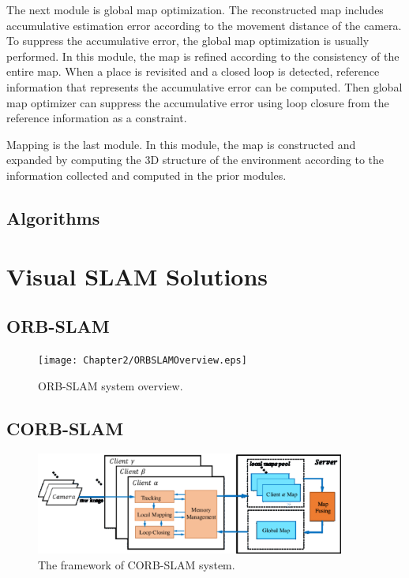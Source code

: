 The next module is global map optimization. The reconstructed map includes accumulative estimation error according to the movement distance of the camera. To suppress the accumulative error, the global map optimization is usually performed. In this module, the map is refined according to the consistency of the entire map. When a place is revisited and a closed loop is detected, reference information that represents the accumulative error can be computed. Then global map optimizer can suppress the accumulative error using loop closure from the reference information as a constraint.

Mapping is the last module. In this module, the map is constructed and expanded by computing the 3D structure of the environment according to the information collected and computed in the prior modules.

\subsection{Algorithms}


\section{Visual SLAM Solutions}

\subsection{ORB-SLAM}
\cite{mur2015orb} \cite{mur2017orb}
\begin{figure}[H]
\centering
\texttt{[image: Chapter2/ORBSLAMOverview.eps]}
\caption{ORB-SLAM system overview.}
\label{fig:orbslamoverview} 
\end{figure}

\subsection{CORB-SLAM}
\cite{li2017corb}
\begin{figure}[H]
\centering
\includegraphics[width=4in]{Chapter2/CORBSLAMOverview.eps}
\caption{The framework of CORB-SLAM system.}
\label{fig:corbslamoverview} 
\end{figure}

